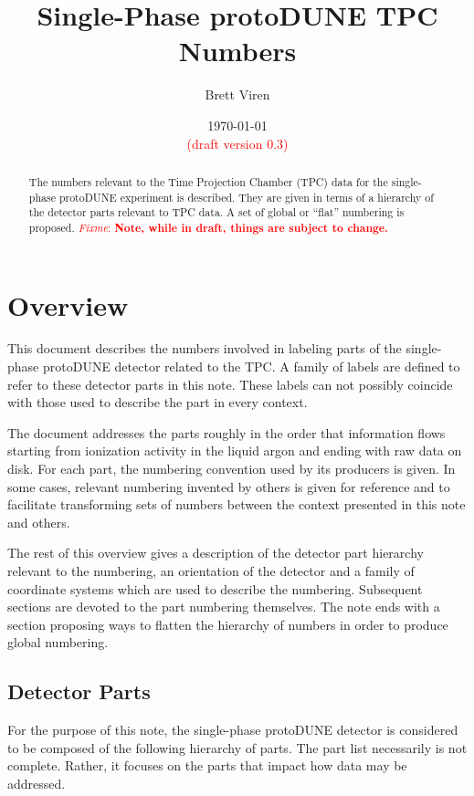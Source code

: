 \documentclass[pdftex,12pt,letter]{article}
\author{Brett Viren}
\date{\today \\ \textcolor{red}{(draft version 0.3)}}
\title{Single-Phase protoDUNE TPC Numbers}
\newcommand{\fixme}[1]{\textcolor{red}{\textit{Fixme}: \textbf{#1}}}
\begin{document}
\maketitle

\begin{abstract}
  The numbers relevant to the Time Projection Chamber (TPC) data for
  the single-phase protoDUNE experiment is described.  They are given
  in terms of a hierarchy of the detector parts relevant to TPC data.
  A set of global or ``flat'' numbering is proposed.  \fixme{Note,
    while in draft, things are subject to change.}
\end{abstract}

\tableofcontents
\newpage
\section{Overview}

This document describes the numbers involved in labeling parts of the
single-phase protoDUNE detector related to the TPC.  A family of
labels are defined to refer to these detector parts in this note.
These labels can not possibly coincide with those used to describe the
part in every context. 

The document addresses the parts roughly in the order that information
flows starting from ionization activity in the liquid argon and ending
with raw data on disk.  For each part, the numbering convention used
by its producers is given.  In some cases, relevant numbering invented
by others is given for reference and to facilitate transforming sets
of numbers between the context presented in this note and others.

The rest of this overview gives a description of the detector part
hierarchy relevant to the numbering, an orientation of the detector
and a family of coordinate systems which are used to describe the
numbering.  Subsequent sections are devoted to the part numbering
themselves.  The note ends with a section proposing ways to flatten
the hierarchy of numbers in order to produce global numbering.

\subsection{Detector Parts}
\label{sec:parts}

For the purpose of this note, the single-phase protoDUNE detector is
considered to be composed of the following hierarchy of parts.  The
part list necessarily is not complete.  Rather, it focuses on the
parts that impact how data may be addressed.
\end{document}
